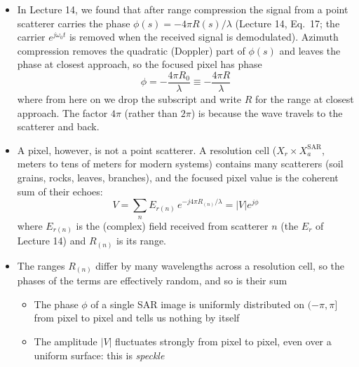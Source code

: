 \documentclass[11pt, oneside]{article}
\begin{document}
\begin{itemize}
	\item In Lecture 14, we found that after range compression the signal from a point scatterer carries the phase $\phi(s) = -4\pi R(s)/\lambda$ (Lecture 14, Eq.~17; the carrier $e^{j\omega_0t}$ is removed when the received signal is demodulated). Azimuth compression removes the quadratic (Doppler) part of $\phi(s)$ and leaves the phase at closest approach, so the focused pixel has phase
	\begin{equation}
		\label{e:phi}
		\phi = -\frac{4\pi R_0}{\lambda} \equiv -\frac{4\pi R}{\lambda}
	\end{equation}
	where from here on we drop the subscript and write $R$ for the range at closest approach. The factor $4\pi$ (rather than $2\pi$) is because the wave travels to the scatterer and back.
	\item A pixel, however, is not a point scatterer. A resolution cell ($X_r \times X_a^\mathrm{SAR}$, meters to tens of meters for modern systems) contains many scatterers (soil grains, rocks, leaves, branches), and the focused pixel value is the coherent sum of their echoes:
	\begin{equation}
		\label{e:Vpixel}
		V = \sum_n E_{r(n)}\,e^{-j4\pi R_{(n)}/\lambda} = |V|e^{j\phi}
	\end{equation}
	where $E_{r(n)}$ is the (complex) field received from scatterer $n$ (the $E_r$ of Lecture 14) and $R_{(n)}$ is its range.
	\item The ranges $R_{(n)}$ differ by many wavelengths across a resolution cell, so the phases of the terms are effectively random, and so is their sum
	\begin{itemize}
		\item[$\Rightarrow$] The phase $\phi$ of a single SAR image is uniformly distributed on $(-\pi, \pi]$ from pixel to pixel and tells us nothing by itself
		\item[$\Rightarrow$] The amplitude $|V|$ fluctuates strongly from pixel to pixel, even over a uniform surface: this is \emph{speckle}
	\end{itemize}
\end{itemize}
\end{document}
